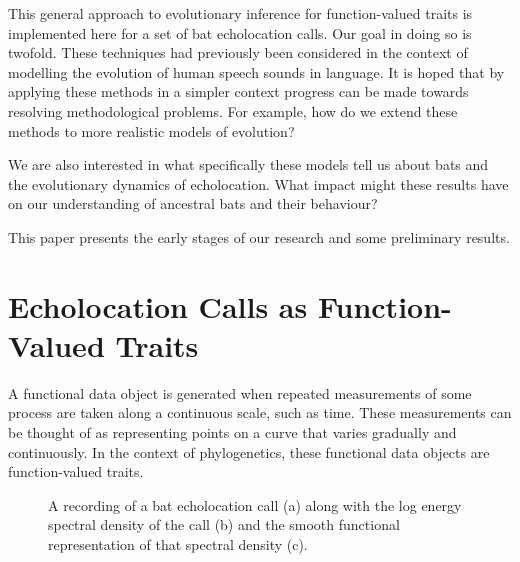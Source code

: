 \documentclass[wsdraft]{ws-rv9x6} %
\begin{document}
This general approach to evolutionary inference for function-valued traits is implemented here for a set of bat echolocation calls. Our goal in doing so is twofold. These techniques had previously been considered in the context of modelling the evolution of human speech sounds in language. \cite{group2012phylogenetic} It is hoped that by applying these methods in a simpler context progress can be made towards resolving methodological problems. For example, how do we extend these methods to more realistic models of evolution?

We are also interested in what specifically these models tell us about bats and the evolutionary dynamics of echolocation. What impact might these results have on our understanding of ancestral bats and their behaviour?

This paper presents the early stages of our research and some preliminary results.

\section{Echolocation Calls as Function-Valued Traits}
\label{sec:funrep}
A functional data object is generated when repeated measurements of some process are taken along a continuous scale, such as time. \cite{ramsay2006functional} 
These measurements can be thought of as representing points on a curve that varies gradually and continuously. In the context of phylogenetics, these functional data objects are function-valued traits. \cite{meyer2005up}

\begin{figure}
	\caption{A recording of a bat echolocation call (a) along with the log energy spectral density of the call (b) and the smooth functional representation of that spectral density (c).}
\end{figure}
\end{document}
